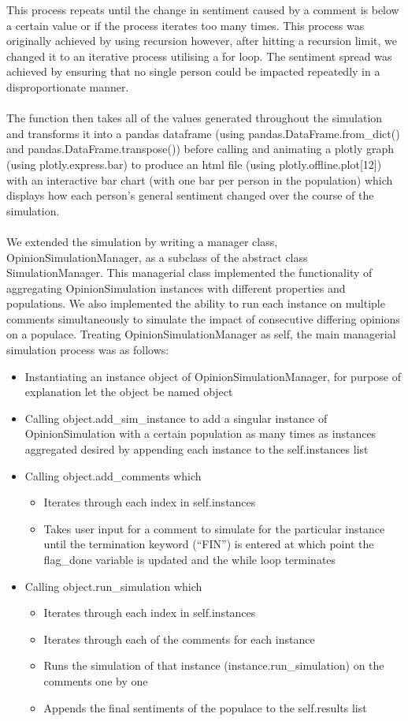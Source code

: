 \documentclass[fontsize=11pt]{article}
\begin{document}
This process repeats until the change in sentiment caused by a comment is below a certain value or if the process iterates too many times. This process was originally achieved by using recursion however, after hitting a recursion limit, we changed it to an iterative process utilising a for loop. The sentiment spread was achieved by ensuring that no single person could be impacted repeatedly in a disproportionate manner. \\\\
The function then takes all of the values generated throughout the simulation and transforms it into a pandas dataframe (using pandas.DataFrame.from\_dict() and pandas.DataFrame.transpose()) before calling and animating a plotly graph (using plotly.express.bar) to produce an html file (using plotly.offline.plot[12]) with an interactive bar chart (with one bar per person in the population) which displays how each person’s general sentiment changed over the course of the simulation. \\\\
We extended the simulation by writing a manager class, OpinionSimulationManager, as a subclass of the abstract class SimulationManager. This managerial class implemented the functionality of aggregating OpinionSimulation instances with different properties and populations. We also implemented the ability to run each instance on multiple comments simultaneously to simulate the impact of consecutive differing opinions on a populace. 
Treating OpinionSimulationManager as self, the main managerial simulation process was as follows:
\begin{itemize}
    \item Instantiating an instance object of OpinionSimulationManager, for purpose of explanation let the object be named object
    \item Calling object.add\_sim\_instance to add a singular instance of OpinionSimulation with a certain population as many times as instances aggregated desired by appending each instance to the self.instances list
    \item Calling object.add\_comments which
    \begin{itemize}
        \item Iterates through each index in self.instances
        \item Takes user input for a comment to simulate for the particular instance until the termination keyword (“FIN”) is entered at which point the flag\_done variable is updated and the while loop terminates
    \end{itemize}
    \item Calling object.run\_simulation which
    \begin{itemize}
        \item Iterates through each index in self.instances
        \item Iterates through each of the comments for each instance
        \item Runs the simulation of that instance (instance.run\_simulation) on the comments one by one
        \item Appends the final sentiments of the populace to the self.results list
    \end{itemize}
\end{itemize}
\end{document}

